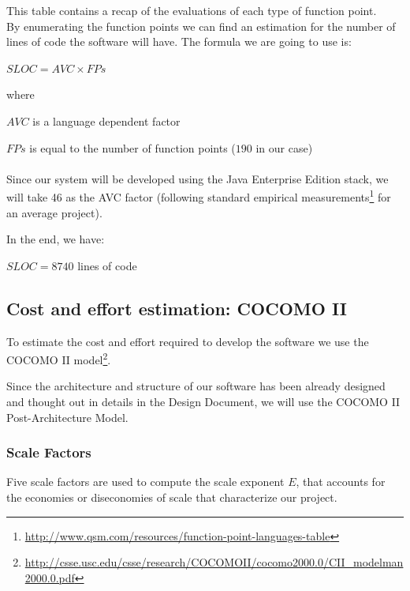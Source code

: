 \documentclass[english]{article}
\begin{document}
This table contains a recap of the evaluations of each type of function point.\\
By enumerating the function points we can find an estimation for the number of lines of code the software will have.
The formula we are going to use is:


\begin{center}
$SLOC = AVC \times FPs$
\end{center}
where

$ AVC $ is a language dependent factor

$ FPs$ is equal to the number of function points ($190$ in our case)

\paragraph{}
Since our system will be developed using the Java Enterprise Edition stack, we will take 46 as the AVC factor (following standard empirical measurements\footnote{\href{http://www.qsm.com/resources/function-point-languages-table}{http://www.qsm.com/resources/function-point-languages-table}} for an average project). 

In the end, we have:

\begin{center}
$SLOC = 8740$ lines of code
\end{center}


\newpage
\subsection{Cost and effort estimation: COCOMO II}

To estimate the cost and effort required to develop the software we use the COCOMO II model\footnote{\href{http://csse.usc.edu/csse/research/COCOMOII/cocomo2000.0/CII\_modelman2000.0.pdf}{http://csse.usc.edu/csse/research/COCOMOII/cocomo2000.0/CII\_modelman2000.0.pdf}}.

Since the architecture and structure of our software has been already designed and thought out in details in the Design Document, we will use the COCOMO II Post-Architecture Model.


\subsubsection{Scale Factors}

Five scale factors are used to compute the scale exponent $E$, that accounts for the economies or diseconomies of scale that characterize our project.
\end{document}
